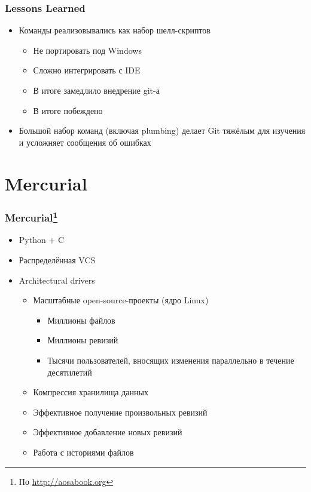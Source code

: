 \documentclass{../../slides-style}
\begin{document}
	\begin{frame}
		\frametitle{Lessons Learned}
		\begin{itemize}
			\item Команды реализовывались как набор шелл-скриптов
			\begin{itemize}
				\item Не портировать под Windows
				\item Сложно интегрировать с IDE
				\item В итоге замедлило внедрение git-а
				\item В итоге побеждено
			\end{itemize}
			\item Большой набор команд (включая plumbing) делает Git тяжёлым для изучения и усложняет сообщения об ошибках
		\end{itemize}
	\end{frame}

	\section{Mercurial}

	\begin{frame}
		\frametitle{Mercurial\footnote{\tiny{По \url{http://aosabook.org}}}}
		\begin{itemize}
			\item Python + C
			\item Распределённая VCS
			\item Architectural drivers
			\begin{itemize}
				\item Масштабные open-source-проекты (ядро Linux)
				\begin{itemize}
					\item Миллионы файлов
					\item Миллионы ревизий
					\item Тысячи пользователей, вносящих изменения параллельно в течение десятилетий
				\end{itemize}
				\item Компрессия хранилища данных
				\item Эффективное получение произвольных ревизий
				\item Эффективное добавление новых ревизий
				\item Работа с историями файлов
			\end{itemize}
		\end{itemize}
	\end{frame}
\end{document}
